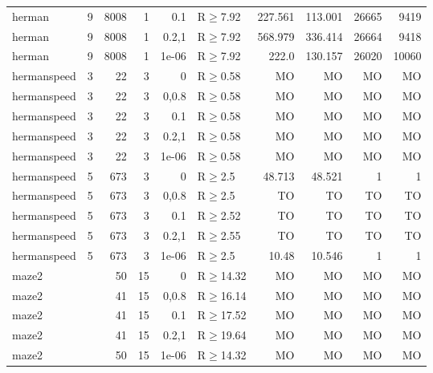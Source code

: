 \begin{longtable}{llrrrlrrrr}
 herman        & 9        &   	8008 &   1 & 0.1   & R$\geq$7.92  & 227.561  & 113.001  & 26665   & 9419   \\
 herman        & 9        &   	8008 &   1 & 0.2,1 & R$\geq$7.92  & 568.979  & 336.414  & 26664   & 9418   \\
 herman        & 9        &   	8008 &   1 & 1e-06 & R$\geq$7.92  & 222.0    & 130.157  & 26020   & 10060  \\
 hermanspeed   & 3        &     	22 &   3 & 0     & R$\geq$0.58  & MO       & MO       & MO      & MO     \\
 hermanspeed   & 3        &     	22 &   3 & 0,0.8 & R$\geq$0.58  & MO       & MO       & MO      & MO     \\
 hermanspeed   & 3        &     	22 &   3 & 0.1   & R$\geq$0.58  & MO       & MO       & MO      & MO     \\
 hermanspeed   & 3        &     	22 &   3 & 0.2,1 & R$\geq$0.58  & MO       & MO       & MO      & MO     \\
 hermanspeed   & 3        &     	22 &   3 & 1e-06 & R$\geq$0.58  & MO       & MO       & MO      & MO     \\
 hermanspeed   & 5        &    	673 &   3 & 0     & R$\geq$2.5   & 48.713   & 48.521   & 1       & 1      \\
 hermanspeed   & 5        &    	673 &   3 & 0,0.8 & R$\geq$2.5   & TO       & TO       & TO      & TO     \\
 hermanspeed   & 5        &    	673 &   3 & 0.1   & R$\geq$2.52  & TO       & TO       & TO      & TO     \\
 hermanspeed   & 5        &    	673 &   3 & 0.2,1 & R$\geq$2.55  & TO       & TO       & TO      & TO     \\
 hermanspeed   & 5        &    	673 &   3 & 1e-06 & R$\geq$2.5   & 10.48    & 10.546   & 1       & 1      \\
 maze2         &          &     	50 &  15 & 0     & R$\geq$14.32 & MO       & MO       & MO      & MO     \\
 maze2         &          &     	41 &  15 & 0,0.8 & R$\geq$16.14 & MO       & MO       & MO      & MO     \\
 maze2         &          &     	41 &  15 & 0.1   & R$\geq$17.52 & MO       & MO       & MO      & MO     \\
 maze2         &          &     	41 &  15 & 0.2,1 & R$\geq$19.64 & MO       & MO       & MO      & MO     \\
 maze2         &          &     	50 &  15 & 1e-06 & R$\geq$14.32 & MO       & MO       & MO      & MO     \\

\end{longtable}
